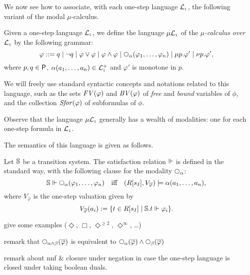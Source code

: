 We now see how to associate, with each one-step language $\mathcal{L}_{\scriptscriptstyle 1}$, the following
variant of the modal $\mu$-calculus.

\begin{definition}
Given a one-step language $\mathcal{L}_{\scriptscriptstyle 1}$, we define the language $\mu\mathcal{L}_{\scriptscriptstyle 1}$ of the 
\emph{$\mu$-calculus over $\mathcal{L}_{\scriptscriptstyle 1}$}  by the following grammar:
\[
\varphi ::= 
   q \mid \neg q 
   \mid \varphi\lor\varphi \mid \varphi\land\varphi 
   \mid \nxt{\al}(\varphi_{1},\ldots,\varphi_{n})
   \mid \mu p. \varphi'    \mid \nu p. \varphi',
\]
where $p,q \in\mathsf{P}$, $\alpha(a_{1},\ldots,a_{n}) \in \mathcal{L}_{\scriptscriptstyle 1}^{+}$ and $\varphi'$ 
is monotone in $p$.

We will freely use standard syntactic concepts and notations related to this 
language, such as the sets $\mathit{FV}(\varphi)$ and $\mathit{BV}(\varphi)$ of \emph{free} and 
\emph{bound} variables of $\phi$, and the collection $\mathit{Sfor}(\varphi)$ of subformulas
of $\phi$.
\end{definition}

Observe that the language $\mu\mathcal{L}_{\scriptscriptstyle 1}$ generally has a wealth of modalities:
one for each one-step formula in $\mathcal{L}_{\scriptscriptstyle 1}$.

The semantics of this language is given as follows.

\begin{definition}
Let $\mathbb{S}$ be a transition system.
The satisfaction relation $\Vdash$ is defined in the standard way, with the 
following clause for the modality $\nxt{\alpha}$:
\begin{equation}\label{eq:mumod}
\model \mmodels \nxt{\al}(\varphi_{1},\ldots,\varphi_{n})
\quad\text{iff}\quad 
(R[s_{I}],V_{\overline{\varphi}}) \models \al(a_{1},\ldots,a_{n}),
\end{equation}
where $V_{\overline{\varphi}}$ is the one-step valuation given by 
\begin{equation}\label{eq:valmod}
V_{\overline{\varphi}}(a_{i}) \isdef 
  \{ t \in R[s_{I}] \mid \model.t \mmodels \varphi_{i}\}.
\end{equation}
\end{definition}

% 

\btbs
\item
give some examples ($\Diamond$, $\Box$, $\Diamond^{\geq 2}$, 
$\Diamond^{\infty}$, \ldots)
\item
remark that $\nxt{\alpha\land\beta}(\ol{\phi})$ is equivalent to
$\nxt{\alpha}(\ol{\phi}) \land \nxt{\beta}(\ol{\phi})$
\item
remark about nnf \& closure under negation in case the one-step 
language is closed under taking boolean duals.
\etbs

